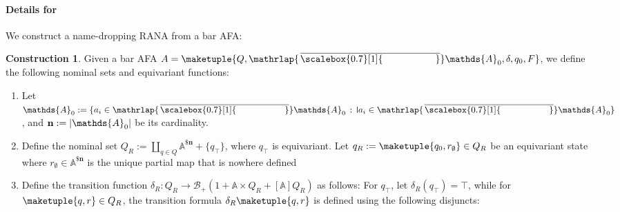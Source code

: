 \documentclass[10pt,a4paper]{amsart}
\theoremstyle{definition}
\newtheorem{construction}[theo]{Construction}
\renewcommand{\textsf}[1]{{\oldtextsf{\small#1}}}
\newcommand{\At}{\mathds{A}}
\newcommand{\card}[1]{\left\vert#1\right\vert}
\newcommand{\allbool}{\mathcal{B}}
\newcommand{\posbool}{\allbool_+}
\DeclareMathOperator{\dom}{\textsf{dom}}
\newcommand{\names}{\At}
\newcommand{\Abstr}[2][\names]{[#1]#2}
\newcommand{\parnom}[1]{\names^{\$\mathbf{#1}}}
\newcommand{\set}[1]{\{#1\}}
\newcommand{\setw}[2]{\{#1\,:\,#2\}}
\newcommand{\mybar}[3]{%
  \mathrlap{\hspace{#2}\overline{\scalebox{#1}[1]{\phantom{\ensuremath{#3}}}}}\ensuremath{#3}
}
\newcommand{\barNames}{{\mybar{0.7}{1.25pt}{\names}}}
\newcommand{\midmid}{\hspace{0.2ex}{\rule[-0.1ex]{0.6pt}{1.65ex}}\hspace{0.2ex}}
\newcommand{\scriptmidmid}{\hspace{0.2ex}{\rule[-0.1ex]{0.6pt}{1.1ex}}\hspace{0.2ex}}
\newcommand{\newletter}[1]{{\midmid}#1}
\newcommand{\scriptnew}[1]{{\scriptmidmid}#1}
\let\originalleft\left
\let\originalright\right
\renewcommand{\left}{\mathopen{}\mathclose\bgroup\originalleft}
\renewcommand{\right}{\aftergroup\egroup\originalright}
\begin{document}
\paragraph*{Details for~} We construct a name-dropping RANA from a bar AFA:

\begin{construction}\label{constr:bafa2rana}
  Given a bar AFA $A = \maketuple{Q, \barNames_0, \delta, q_0, F}$, we define the following nominal sets and equivariant functions:
  \begin{enumerate}
    \item Let $\names_0 := \setw{a_i \in \barNames_0}{\newletter{a_i} \in \barNames_0}$, and $\mathbf{n}
      := \card{\names_0}$ be its cardinality.
    \item Define the nominal set $Q_{R} := \coprod_{q \in Q} \parnom{n} + \set{q_\top}$, where
      $q_{\top}$ is equivariant. Let $q_R := \maketuple{q_0, r_\emptyset} \in Q_R$ be an equivariant state
      where $r_\emptyset \in \parnom{n}$ is the unique partial map that is nowhere defined
    \item Define the transition function $\delta_R\colon Q_R \to \posbool(1 + \names \times Q_R + \Abstr{Q_R})$
      as follows: For ${q_{\top}}$, let $\delta_{R}({q_\top}) = \top$, while for
      $\maketuple{q,r} \in Q_R$, the transition formula $\delta_R\maketuple{q,r}$ is defined using the following disjuncts:
\end{enumerate}
\end{construction}
\end{document}
